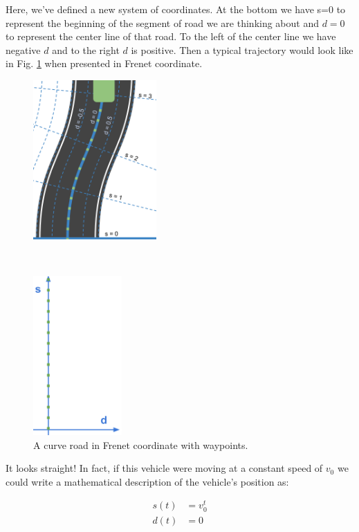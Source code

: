 Here, we've defined a new system of coordinates. At the bottom we have s=0 to represent the beginning of the segment of road we are thinking about and $d=0$ to represent the center line of that road. To the left of the center line we have negative $d$ and to the right $d$ is positive. Then a typical trajectory would look like in Fig. \ref{fig:curve-in-frenet-wp} when presented in Frenet coordinate.

\begin{figure}[h]
  \centering
    \begin{minipage}{.5\textwidth}
        \centering
        \includegraphics[height=2.4in]{figs/ch3/curve-in-frenet-with-waypoints}
    \end{minipage}
    ~
    \begin{minipage}{.5\textwidth}
       \centering
      \includegraphics[height=2.4in]{figs/ch3/waypoints-in-frenet}
     \end{minipage}
\caption{A curve road in Frenet coordinate with waypoints.}
\label{fig:curve-in-frenet-wp}
\end{figure}

It looks straight! In fact, if this vehicle were moving at a constant speed of $v_0$ we could write a mathematical description of the vehicle's position as:

\begin{subequations} \label{eq:math-in-frenet}
\begin{align}
s(t) &= v_0^t \\
d(t) &= 0
\end{align}
\end{subequations}

